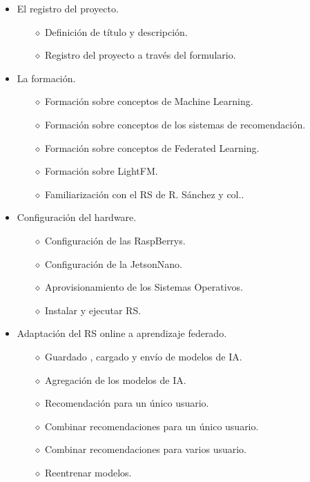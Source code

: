 \begin{itemize}
    \item El registro del proyecto. 
        \begin{itemize}
            \item [$\diamond$]Definición de título y descripción.
            \item [$\diamond$]Registro del proyecto a través del formulario.
        \end{itemize}
    \item La formación.
        \begin{itemize}
            \item [$\diamond$]Formación sobre conceptos de Machine Learning.
            \item [$\diamond$]Formación sobre conceptos de los sistemas de recomendación.
            \item [$\diamond$]Formación sobre conceptos de Federated Learning.
            \item [$\diamond$]Formación sobre LightFM.
            \item [$\diamond$]Familiarización con el RS de R. Sánchez y col..
        \end{itemize}
    \item Configuración del hardware.
        \begin{itemize}
            \item [$\diamond$]Configuración de las RaspBerrys.
            \item [$\diamond$]Configuración de la JetsonNano.
            \item [$\diamond$]Aprovisionamiento de los Sistemas Operativos.
            \item [$\diamond$]Instalar y ejecutar RS.
        \end{itemize}
    \item Adaptación del RS online a aprendizaje federado.
        \begin{itemize}
            \item [$\diamond$]Guardado , cargado y envío de modelos de IA.
            \item [$\diamond$]Agregación de los modelos de IA.
            \item [$\diamond$]Recomendación para un único usuario.
            \item [$\diamond$]Combinar recomendaciones para un único usuario.
            \item [$\diamond$]Combinar recomendaciones para varios usuario.
            \item [$\diamond$]Reentrenar modelos.

\end{itemize}
\end{itemize}
